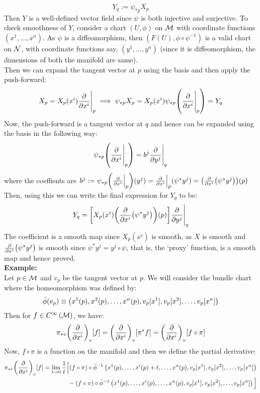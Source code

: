 $$Y_q :=\psi_{*p}X_p$$
Then $Y$ is a well-defined vector field since $\psi$ is both injective and surjective. To check smoothness of $Y$, consider a chart $(U,\phi)$ on $\mathcal M$ with coordinate functions $(x^1,\ldots,x^n)$. As $\psi$ is a diffeomorphism, then $(F(U), \phi\circ\psi^{-1})$ is a valid chart on $\mathcal N$, with coordinate functions say, $(y^1,\ldots,y^n)$ (since it is diffeomorphism, the dimensions of both the manifold are same).\\[0.2cm]
Then we can expand the tangent vector at $p$ using the basis and then apply the push-forward:
$$X_p = X_p(x^i)\pdv{x^i}\Bigg|_p \implies \psi_{*p}X_p =  X_p(x^i)\psi_{*p}\qty(\pdv{x^i}\Bigg|_p)=Y_q$$
Now, the push-forward is a tangent vector at $q$ and hence can be expanded using the basis in the following way:
$$\psi_{*p}\qty(\pdv{x^i}\Bigg|_p) = b^j \pdv{y^j}\Bigg|_q$$
where the coeffients are $b^j := \psi_{*p}\qty(\pdv{x^i}\Big|_p)(y^j) = \pdv{x^i}\Big|_p (\psi^*y^j) =\qty(\pdv{x^i} (\psi^*y^j))(p)$
Then, using this we can write the final expression for $Y_q$ to be:
$$Y_q = \qty[X_p(x^i)\qty(\pdv{x^i} (\psi^*y^j))(p)]\pdv{y^j}\Bigg|_q$$
The coefficient is a smooth map since $X_p(x^i)$ is smooth, as $X$ is smooth and $\pdv{x^i} (\psi^*y^j)$ is smooth since $\psi^*y^j = y^j\circ \psi$, that is, the `proxy' function, is a smooth map and hence proved.\\[0.2cm]
\textbf{Example:}\\[0.2cm]
Let $p\in \mathcal M$ and $v_p$ be the tangent vector at $p$. We will consider the bundle chart where the homeomorphism was defined by:
$$\bar{\phi}(v_p)\equiv \left( x^1(p), x^2(p),\ldots,x^n(p),v_p[x^1], v_p[x^2],\ldots,v_p[x^n] \right)$$ 
Then for $f\in C^{\infty}\left(\mathcal M\right)$, we have:
\begin{align*}
  \pi_{*v}\qty(\pdv{x^i})_v[f] = \qty(\pdv{x^i})_v[\pi^*f] = \qty(\pdv{x^i})_v[f\circ\pi]
\end{align*}
Now, $f\circ\pi$ is a function on the manifold and then we define the partial derivative:
\begin{align*}
   \pi_{*v}\qty(\pdv{x^i})_v[f] &= \lim\limits_{t\rightarrow 0} \frac{1}{t}\Big[(f\circ \pi)\circ\bar{\phi}^{-1}\left( x^1(p),\ldots, x^i(p)+t,\ldots,x^n(p),v_p[x^1], v_p[x^2],\ldots,v_p[x^n] \right)\\&\qquad\qquad-(f\circ \pi)\circ\bar{\phi}^{-1}\left( x^1(p),\ldots, x^i(p),\ldots,x^n(p),v_p[x^1], v_p[x^2],\ldots,v_p[x^n] \right) \Big]
\end{align*}
